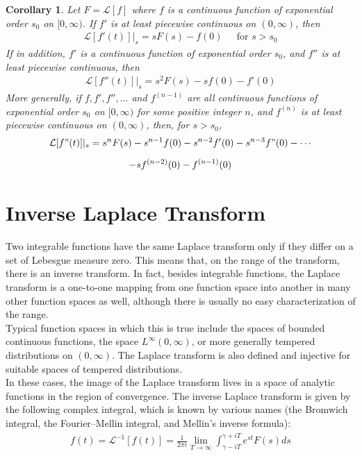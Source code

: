 \documentclass[11pt]{report}
\newtheorem{corollary}{Corollary}[chapter]
\newcommand{\sps}{\\[0.2cm]}
\newcommand{\NI}{\noindent}
\begin{document}
	\begin{corollary}
		Let $F = \mathcal{L}[f]$ where $f$ is a continuous function of exponential order $s_0$ on $[0, \infty)$. If $f'$ is at least piecewise continuous on $(0, \infty)$, then
		\begin{eqnarray*}
			\mathcal{L}[f'(t)]|_s = sF(s) - f(0)~~~~~ \text{ for } s>s_0
		\end{eqnarray*}
		If in addition, $f'$ is a continuous function of exponential order $s_0$, and $f''$ is at least piecewise continuous, then
		\begin{eqnarray*}
			\mathcal{L}[f''(t)]|_s = s^2F(s) - sf(0) - f'(0)
		\end{eqnarray*}
		More generally, if $f, f', f'',\ldots$ and  $f^{(n-1)}$ are all continuous functions of exponential order $s_0$ on $[0, \infty)$ for some positive integer $n$, and $f^{(n)}$ is at least piecewise continuous on $(0, \infty)$, then, for $s>s_0$,
		\begin{multline*}
			\mathcal{L}[f"(t)]|_s = s^n F(s) - s^{n-1} f(0) - s^{n-2}f'(0) - s^{n-3}f"(0) - \cdots \sps- sf^{(n-2)}(0) - f^{(n-1)}(0)
		\end{multline*}
	\end{corollary}


	\section{Inverse Laplace Transform}
	Two integrable functions have the same Laplace transform only if they differ on a set of Lebesgue measure zero. This means that, on the range of the transform, there is an inverse transform. In fact, besides integrable functions, the Laplace transform is a one-to-one mapping from one function space into another in many other function spaces as well, although there is usually no easy characterization of the range.\\

	\NI Typical function spaces in which this is true include the spaces of bounded continuous functions, the space $L^\infty (0 , \infty)$, or more generally tempered distributions on $(0 , \infty)$. The Laplace transform is also defined and injective for suitable spaces of tempered distributions.\\
	
	\NI In these cases, the image of the Laplace transform lives in a space of analytic functions in the region of convergence. The inverse Laplace transform is given by the following complex integral, which is known by various names (the Bromwich integral, the Fourier–Mellin integral, and Mellin's inverse formula):
	\begin{eqnarray*}
		f(t) = \mathcal{L}^{-1} [f(t)] = \frac{1}{2\pi i} \lim_{T \to \infty}\int_{\gamma - iT}^{\gamma + iT} e^{st} F(s) ds
	\end{eqnarray*}
\end{document}

